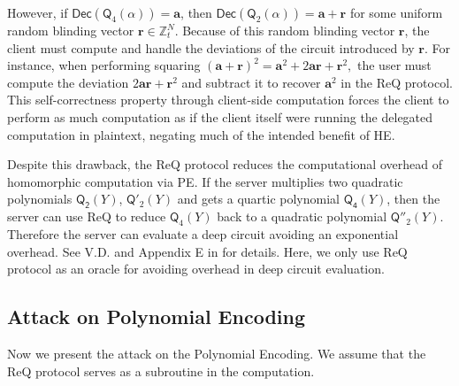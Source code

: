 \documentclass[runningheads]{llncs}
\newcommand{\PE}{\textsf{PE}{}}
\newcommand{\REQ}{\textsf{ReQ}}
\newcommand{\dec}{\textsf{Dec}}
\begin{document}
        However, if $\dec(\mathsf{Q}_4(\alpha)) = \mathbf{a}$, 
        then $\dec(\mathsf{Q}_2(\alpha)) = \mathbf{a} + \mathbf{r}$ 
        for some uniform random blinding vector $\mathbf{r} \in \mathbb{Z}_t^N$.
        Because of this random blinding vector $\mathbf{r}$, the client must compute and handle the deviations of the circuit introduced by $\mathbf{r}$.
        For instance, when performing squaring 
        \(
        (\mathbf{a} + \mathbf{r})^2 
        = \mathbf{a}^2 + 2\mathbf{a}\mathbf{r} + \mathbf{r}^2,
        \)
        the user must compute the deviation $2\mathbf{a}\mathbf{r} + \mathbf{r}^2$ and subtract it to recover $\mathbf{a}^2$ in the \REQ{} protocol. This self-correctness property through client-side computation forces the client to perform as much computation as if the client itself were running the delegated computation in plaintext, negating much of the intended benefit of HE.
        
        Despite this drawback, the \REQ{} protocol reduces the computational overhead of homomorphic computation via \PE.
        If the server multiplies two quadratic polynomials $\mathsf{Q_2}(Y)$, $\mathsf{Q}'_2(Y)$ and gets a quartic polynomial $\mathsf{Q_4}(Y)$, then the server can use \REQ{} to reduce $\mathsf{Q}_4(Y)$ back to a quadratic polynomial $\mathsf{Q}''_2(Y)$. Therefore the server can evaluate a deep circuit avoiding an exponential overhead.
        See V.D. and Appendix E in \cite{VE} for details.
        Here, we only use \REQ{} protocol as an oracle for avoiding overhead in deep circuit evaluation.
      
    \subsection{Attack on Polynomial Encoding}
    Now we present the attack on the Polynomial Encoding. We assume that the \REQ{} protocol serves as a subroutine in the computation. 
    
\end{document}
